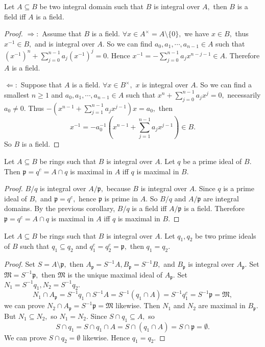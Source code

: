 \begin{prop}
Let $A\subseteq B$ be two integral domain such that $B$ is integral
over $A,$ then $B$ is a field iff $A$ is a field.
\end{prop}
\begin{proof}
$\Longrightarrow:$ Assume that $B$ is a field. $\forall x\in
A^{\times}=A\setminus \{0\},$ we have $x\in B,$ thus $x^{-1}\in B,$
and is integral over $A.$ So we can find $a_0,a_1,\cdots,a_{n-1}\in
A$ such that $(x^{-1})^n+\sum\limits_{j=0}^{n-1}a_j(x^{-1})^j=0.$
Hence $x^{-1}=-\sum\limits_{j=0}^{n-1}a_jx^{n-j-1}\in A.$ Therefore
$A$ is a field.

$\Longleftarrow:$ Suppose that $A$ is a field. $\forall x\in
B^{\times},$ $x$ is integral over $A.$ So we can find a smallest
$n\geqslant 1$ and $a_0,a_1,\cdots,a_{n-1}\in A$ such that
$x^n+\sum\limits_{j=0}^{n-1}a_jx^j=0,$ necessarily $a_0\neq 0.$ Thus
$-(x^{n-1}+\sum\limits_{j=1}^{n-1}a_jx^{j-1})x=a_0,$ then
$$x^{-1}=-a_0^{-1}(x^{n-1}+\sum\limits_{j=1}^{n-1}a_jx^{j-1})\in
B.$$
So $B$ is a field.
\end{proof}
\begin{prop}
Let $A\subseteq B$ be rings such that $B$ is integral over $A.$ Let
$q$ be a prime ideal of $B.$ Then $\mathfrak{p}=q^c=A\cap q$ is
maximal in $A$ iff $q$ is maximal in $B.$
\end{prop}
\begin{proof}
$B/q$ is integral over $A/\mathfrak{p},$ because $B$ is integral
over $A.$ Since $q$ is a prime ideal of $B,$ and $\mathfrak{p}=q^c,$
hence $\mathfrak{p}$ is prime in $A.$ So $B/q$ and $A/\mathfrak{p}$
are integral domains. By the previous corollary, $B/q$ is a field
iff $A/\mathfrak{p}$ is a field. Therefore $\mathfrak{p}=q^c=A\cap
q$ is maximal in $A$ iff $q$ is maximal in $B.$
\end{proof}
\begin{cor}
Let $A\subseteq B$ be rings such that $B$ is integral over $A.$ Let
$q_1,q_2$ be two prime ideals of $B$ such that $q_1\subseteq q_2$
and $q_1^c=q_2^c=\mathfrak{p},$ then $q_1=q_2.$
\end{cor}
\begin{proof}
Set $S=A\setminus \mathfrak{p},$ then $A_{\mathfrak{p}} = S^{-1}A,
B_{\mathfrak{p}} = S^{-1}B,$ and $B_{\mathfrak{p}}$ is integral over
$A_{\mathfrak{p}}.$ Set $\mathfrak{M}=S^{-1}\mathfrak{p},$ then
$\mathfrak{M}$ is the unique maximal ideal of $A_{\mathfrak{p}}.$
Set $N_1=S^{-1}q_1, N_2=S^{-1}q_2.$
$$N_1\cap A_{\mathfrak{p}} = S^{-1}q_1\cap S^{-1}A = S^{-1}(q_1\cap
A) = S^{-1}q_1^c = S^{-1}\mathfrak{p} = \mathfrak{M},$$ we can prove
$N_2\cap A_{\mathfrak{p}} = S^{-1}\mathfrak{p} = \mathfrak{M}$
likewise. Then $N_1$ and $N_2$ are maximal in $B_{\mathfrak{p}}.$
But $N_1\subseteq N_2,$ so $N_1=N_2.$ Since $S\cap q_1\subseteq A,$
so
$$S\cap q_1 = S\cap q_1\cap A = S\cap (q_1\cap A) = S\cap
\mathfrak{p} = \emptyset.$$ We can prove $S\cap q_2=\emptyset$
likewise. Hence $q_1=q_2.$
\end{proof}

